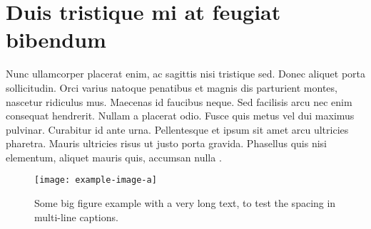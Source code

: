 \section{Duis tristique mi at feugiat bibendum}
 Nunc ullamcorper placerat enim, ac sagittis nisi tristique sed. Donec aliquet porta sollicitudin. Orci varius natoque penatibus et magnis dis parturient montes, nascetur ridiculus mus. Maecenas id faucibus neque. Sed facilisis arcu nec enim consequat hendrerit. Nullam a placerat odio. Fusce quis metus vel dui maximus pulvinar. Curabitur id ante urna. Pellentesque et ipsum sit amet arcu ultricies pharetra. Mauris ultricies risus ut justo porta gravida. Phasellus quis nisi elementum, aliquet mauris quis, accumsan nulla \cite{einstein}.


\begin{figure}
\centering
  \texttt{[image: example-image-a]}
  \caption{Some big figure example with a very long text, to test the spacing in multi-line captions.}
  \label{figure:1}
\end{figure}